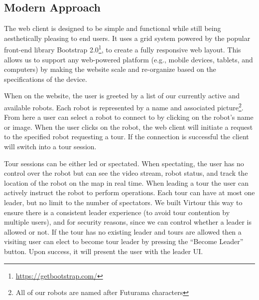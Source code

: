 \documentclass[
  oneside,
  11pt, a4paper,
  footinclude=true,
  headinclude=true,
  cleardoublepage=empty
]{article}
\begin{document}
\subsection{Modern Approach}

The web client is designed to be simple and functional while still being
aesthetically pleasing to end users. It uses a grid system powered by the
popular front-end library Bootstrap
2.0\footnote{\url{https://getbootstrap.com/}}, to create a fully responsive web
layout. This allows us to support any web-powered platform (e.g., mobile
devices, tablets, and computers) by making the website scale and re-organize
based on the specifications of the device.

When on the website, the user is greeted by a list of our currently active and
available robots. Each robot is represented by a name and associated
picture\footnote{All of our robots are named after Futurama characters}. From
here a user can select a robot to connect to by clicking on the robot's name
or image. When the user clicks on the robot, the web client will initiate a
request to the specified robot requesting a tour. If the connection is
successful the client will switch into a tour session.

Tour sessions can be either led or spectated. When spectating, the user has no
control over the robot but can see the video stream, robot status, and track
the location of the robot on the map in real time. When leading a tour the user
can actively instruct the robot to perform operations. Each tour can have at
most one leader, but no limit to the number of spectators. We built Virtour
this way to ensure there is a consistent leader experience (to avoid tour
contention by multiple users), and for security reasons, since we can control
whether a leader is allowed or not. If the tour has no existing leader and
tours are allowed then a visiting user can elect to become tour leader by
pressing the ``Become Leader'' button. Upon success, it will present the user
with the leader UI.
\end{document}
